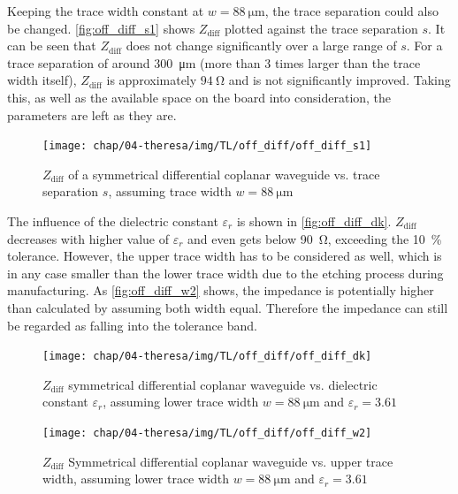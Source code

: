Keeping the trace width constant at $w = \SI{88}{\micro \meter}$, the trace separation could also be changed.
\autoref{fig:off_diff_s1} shows $Z_\text{diff}$ plotted against the trace separation $s$.
It can be seen that $Z_\text{diff}$ does not change significantly over a large range of $s$.
For a trace separation of around \SI{300}{\micro \meter} (more than 3 times larger than the trace width itself), $Z_\text{diff}$ is approximately $\SI{94}{\ohm}$ and is not significantly improved.
Taking this, as well as the available space on the board into consideration, the parameters are left as they are.  
\begin{figure}[tb]
	\centering
	\texttt{[image: chap/04-theresa/img/TL/off\_diff/off\_diff\_s1]}
	\caption[SCWG, $Z_\text{diff}$ vs. $s$]{$Z_\text{diff}$ of a symmetrical differential coplanar waveguide vs. trace separation $s$, assuming trace width $w = \SI{88}{\micro \meter}$}
	\label{fig:off_diff_s1}
\end{figure}

The influence of the dielectric constant $\varepsilon_r$ is shown in \autoref{fig:off_diff_dk}. 
$Z_\text{diff}$ decreases with higher value of $\varepsilon_r$ and even gets below \SI{90}{\ohm}, exceeding the \SI{10}{\percent} tolerance.
However, the upper trace width has to be considered as well, which is in any case smaller than the lower trace width due to the etching process during manufacturing.
As \autoref{fig:off_diff_w2} shows, the impedance is potentially higher than calculated by assuming both width equal. Therefore the impedance can still be regarded as falling into the tolerance band.
\begin{figure}[tb]
	\centering
	\texttt{[image: chap/04-theresa/img/TL/off\_diff/off\_diff\_dk]}
	\caption[SCWG, $Z_\text{diff}$ vs. $\varepsilon_r$]{$Z_\text{diff}$ symmetrical differential coplanar waveguide vs. dielectric constant $\varepsilon_r$, assuming lower trace width $w = \SI{88}{\micro \meter}$ and $\varepsilon_r = 3.61$}
	\label{fig:off_diff_dk}
\end{figure}


\begin{figure}[tb]
	\centering
	\texttt{[image: chap/04-theresa/img/TL/off\_diff/off\_diff\_w2]}
	\caption[SCWG, $Z_\text{diff}$ vs. upper trace width]{$Z_\text{diff}$ Symmetrical differential coplanar waveguide vs. upper trace width, assuming lower trace width $w = \SI{88}{\micro \meter}$ and $\varepsilon_r = 3.61$}
	\label{fig:off_diff_w2}
\end{figure}

